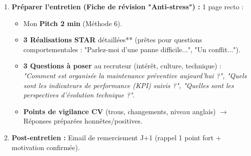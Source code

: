 \documentclass[11pt]{article}
\begin{document}
\begin{methode}
\begin{enumerate}
\begin{itemize}
    \end{itemize}
    \item \textbf{Préparer l'entretien (Fiche de révision "Anti-stress") :} 1 page recto :
    \begin{itemize}
        \item Mon \textbf{Pitch 2 min} (Méthode 6).
        \item \textbf{3 Réalisations STAR} détaillées** (prêtes pour questions comportementales : "Parlez-moi d'une panne difficile...", "Un conflit...").
        \item \textbf{3 Questions à poser} au recruteur (intérêt, culture, technique) : \emph{"Comment est organisée la maintenance préventive aujourd'hui ?", "Quels sont les indicateurs de performance (KPI) suivis ?", "Quelles sont les perspectives d'évolution technique ?"}.
        \item \textbf{Points de vigilance CV} (trous, changements, niveau anglais) $\rightarrow$ Réponses préparées honnêtes/positives.
    \end{itemize}
    \item \textbf{Post-entretien :} Email de remerciement J+1 (rappel 1 point fort + motivation confirmée).
\end{enumerate}
\end{methode}
\end{document}
